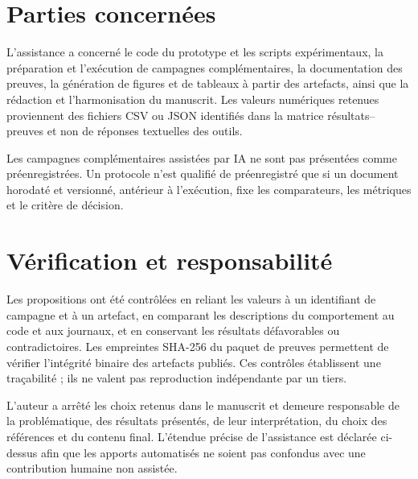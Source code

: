 \section*{Parties concernées}

L'assistance a concerné le code du prototype et les scripts expérimentaux, la préparation
et l'exécution de campagnes complémentaires, la documentation des preuves, la génération
de figures et de tableaux à partir des artefacts, ainsi que la rédaction et
l'harmonisation du manuscrit. Les valeurs numériques retenues proviennent des fichiers
CSV ou JSON identifiés dans la matrice résultats--preuves et non de réponses textuelles
des outils.

Les campagnes complémentaires assistées par IA ne sont pas présentées comme
préenregistrées. Un protocole n'est qualifié de préenregistré que si un document
horodaté et versionné, antérieur à l'exécution, fixe les comparateurs, les métriques et
le critère de décision.

\section*{Vérification et responsabilité}

Les propositions ont été contrôlées en reliant les valeurs à un identifiant de campagne
et à un artefact, en comparant les descriptions du comportement au code et aux journaux,
et en conservant les résultats défavorables ou contradictoires. Les empreintes SHA-256
du paquet de preuves permettent de vérifier l'intégrité binaire des artefacts publiés.
Ces contrôles établissent une traçabilité ; ils ne valent pas reproduction indépendante
par un tiers.

L'auteur a arrêté les choix retenus dans le manuscrit et demeure responsable de la
problématique, des résultats présentés, de leur interprétation, du choix des références
et du contenu final. L'étendue précise de l'assistance est déclarée ci-dessus afin que
les apports automatisés ne soient pas confondus avec une contribution humaine non
assistée.
